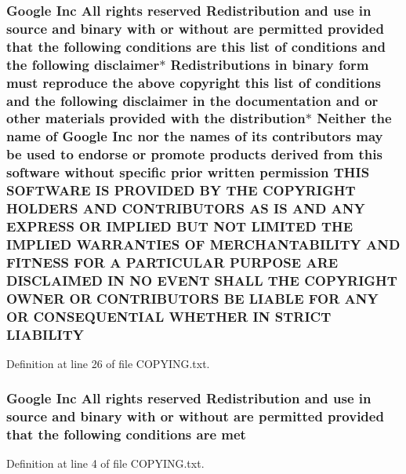 \subsubsection[{\texorpdfstring{L\+I\+A\+B\+I\+L\+I\+TY}{LIABILITY}}]{\setlength{\rightskip}{0pt plus 5cm}Google Inc All rights reserved Redistribution and use in source and binary with or without are permitted provided that the following conditions are this {\bf list} of conditions and the following disclaimer$\ast$ Redistributions in binary form must reproduce the above copyright this {\bf list} of conditions and the following disclaimer in the documentation and or other materials provided with the distribution$\ast$ Neither the name of Google Inc nor the names of its contributors may be used to endorse or promote products derived from this software without specific prior written permission T\+H\+IS S\+O\+F\+T\+W\+A\+RE IS P\+R\+O\+V\+I\+D\+ED BY T\+HE C\+O\+P\+Y\+R\+I\+G\+HT H\+O\+L\+D\+E\+RS A\+ND C\+O\+N\+T\+R\+I\+B\+U\+T\+O\+RS AS IS A\+ND A\+NY E\+X\+P\+R\+E\+SS OR I\+M\+P\+L\+I\+ED B\+UT N\+OT L\+I\+M\+I\+T\+ED T\+HE I\+M\+P\+L\+I\+ED {\bf W\+A\+R\+R\+A\+N\+T\+I\+ES} OF M\+E\+R\+C\+H\+A\+N\+T\+A\+B\+I\+L\+I\+TY A\+ND F\+I\+T\+N\+E\+SS F\+OR A P\+A\+R\+T\+I\+C\+U\+L\+AR P\+U\+R\+P\+O\+SE A\+RE D\+I\+S\+C\+L\+A\+I\+M\+ED IN NO E\+V\+E\+NT S\+H\+A\+LL T\+HE C\+O\+P\+Y\+R\+I\+G\+HT O\+W\+N\+ER OR C\+O\+N\+T\+R\+I\+B\+U\+T\+O\+RS BE L\+I\+A\+B\+LE F\+OR A\+NY OR C\+O\+N\+S\+E\+Q\+U\+E\+N\+T\+I\+AL W\+H\+E\+T\+H\+ER IN S\+T\+R\+I\+CT L\+I\+A\+B\+I\+L\+I\+TY}\hypertarget{COPYING_8txt_a44320ff734839f8d00a0bf9c461148da}{}\label{COPYING_8txt_a44320ff734839f8d00a0bf9c461148da}


Definition at line 26 of file C\+O\+P\+Y\+I\+N\+G.\+txt.

\subsubsection[{\texorpdfstring{met}{met}}]{\setlength{\rightskip}{0pt plus 5cm}Google Inc All rights reserved Redistribution and use in source and binary with or without are permitted provided that the following conditions are met}\hypertarget{COPYING_8txt_a7fcad91ae03c073e2d86b0306333f44b}{}\label{COPYING_8txt_a7fcad91ae03c073e2d86b0306333f44b}


Definition at line 4 of file C\+O\+P\+Y\+I\+N\+G.\+txt.

